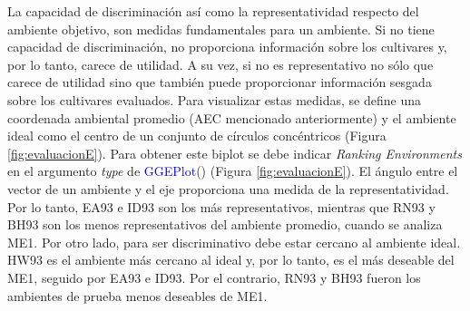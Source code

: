 La capacidad de discriminación así como la representatividad respecto del ambiente objetivo, son medidas fundamentales para un ambiente. Si no tiene capacidad de discriminación, no proporciona información sobre los cultivares y, por lo tanto, carece de utilidad. A su vez, si no es representativo no sólo que carece de utilidad sino que también puede proporcionar información sesgada sobre los cultivares evaluados. Para visualizar estas medidas, se define una coordenada ambiental promedio (AEC mencionado anteriormente) y el ambiente ideal como el centro de un conjunto de círculos concéntricos (Figura \ref{fig:evaluacionE}). Para obtener este biplot se debe indicar \emph{Ranking Environments} en el argumento \emph{type} de \textcolor{blue}{GGEPlot}() (Figura \ref{fig:evaluacionE}). El ángulo entre el vector de un ambiente y el eje proporciona una medida de la representatividad. Por lo tanto, EA93 e ID93 son los más representativos, mientras que RN93 y BH93 son los menos representativos del ambiente promedio, cuando se analiza ME1. Por otro lado, para ser discriminativo debe estar cercano al ambiente ideal. HW93 es el ambiente más cercano al ideal y, por lo tanto, es el más deseable del ME1, seguido por EA93 e ID93. Por el contrario, RN93 y BH93 fueron los ambientes de prueba menos deseables de ME1. 



